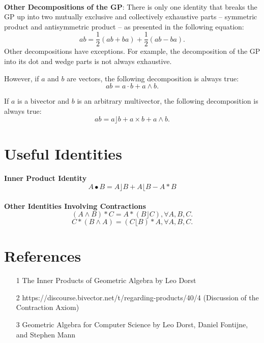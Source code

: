 \documentclass{article}
\begin{document}
\paragraph{}\textbf{Other Decompositions of the GP}: There is only one identity that breaks the GP up into two 
mutually exclusive and collectively exhaustive parts -- 
symmetric product and antisymmetric product -- as presented in the following equation:
$$ab = \frac{1}{2}(ab + ba) + \frac{1}{2}(ab - ba).$$
Other decompositions have exceptions. For example, the decomposition of the GP into its dot and wedge parts 
is not always exhaustive.

However, if $a$ and $b$ are vectors, the following decomposition is always true:
$$ab = a \cdot b + a \wedge b.$$

If $a$ is a bivector and $b$ is an arbitrary multivector, the following decomposition is always true:
$$ab = a \rfloor b + a \times b + a \wedge b.$$


\section{Useful Identities}

\paragraph{}\textbf{Inner Product Identity} 
$$A\bullet B = A\rfloor B + A\lfloor B - A * B$$

\paragraph{}\textbf{Other Identities Involving Contractions}
$$(A \wedge B) * C = A * (B \rfloor C), \forall A,B,C.$$
$$C * (B \wedge A) = (C \lfloor B) * A, \forall A,B,C.$$


\section{References}

\begin{enumerate}
    \item [1] The Inner Products of Geometric Algebra by Leo Dorst
    \item [2] https://discourse.bivector.net/t/regarding-products/40/4 (Discussion of the Contraction Axiom)
    \item [3] Geometric Algebra for Computer Science by Leo Dorst, Daniel Fontijne, and Stephen Mann
    
\end{enumerate}
\end{document}
